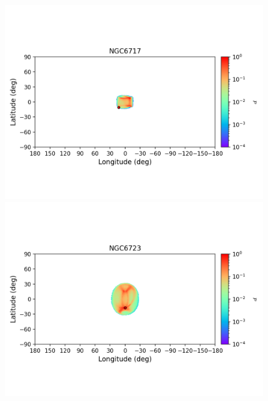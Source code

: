         \begin{figure}
            \begin{center}
                \includegraphics[clip=true, trim = 0mm 20mm 0mm 10mm, width=1\columnwidth]{images/error_plots_NGC6717.png}
                \includegraphics[clip=true, trim = 0mm 20mm 0mm 10mm, width=1\columnwidth]{images/error_plots_NGC6723.png}
                

\end{center}
\end{figure}
